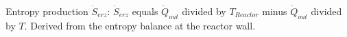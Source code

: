 Entropy production \( \dot{S}_{erz} \):  
\( \dot{S}_{erz} \) equals \( \dot{Q}_{out} \) divided by \( T_{Reactor} \) minus \( \dot{Q}_{out} \) divided by \( T \).  
Derived from the entropy balance at the reactor wall.